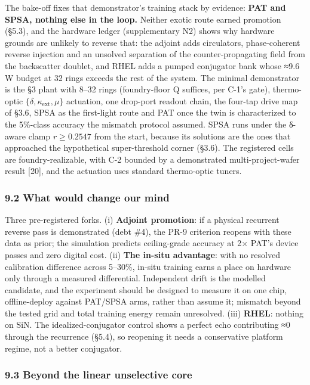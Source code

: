 \documentclass[
  10pt,
]{article}
\begin{document}
The bake-off fixes that demonstrator's training stack by evidence:
\textbf{PAT and SPSA, nothing else in the loop.} Neither exotic route
earned promotion (§5.3), and the hardware ledger (supplementary N2)
shows why hardware grounds are unlikely to reverse that: the adjoint
adds circulators, phase-coherent reverse injection and an unsolved
separation of the counter-propagating field from the backscatter
doublet, and RHEL adds a pumped conjugator bank whose ≈9.6 W budget at
32 rings exceeds the rest of the system. The minimal demonstrator is the
§3 plant with 8--32 rings (foundry-floor Q suffices, per C-1's gate),
thermo-optic \(\{\delta, \kappa_\text{ext}, \mu\}\) actuation, one
drop-port readout chain, the four-tap drive map of §3.6, SPSA as the
first-light route and PAT once the twin is characterized to the
5\%-class accuracy the mismatch protocol assumed. SPSA runs under the
δ-aware clamp \(r \geq 0.2547\) from the start, because its solutions
are the ones that approached the hypothetical super-threshold corner
(§3.6). The registered cells are foundry-realizable, with C-2 bounded by
a demonstrated multi-project-wafer result {[}20{]}, and the actuation
uses standard thermo-optic tuners.

\subsubsection{9.2 What would change our
mind}\label{what-would-change-our-mind}

Three pre-registered forks. (i) \textbf{Adjoint promotion}: if a
physical recurrent reverse pass is demonstrated (debt \#4), the PR-9
criterion reopens with these data as prior; the simulation predicts
ceiling-grade accuracy at 2× PAT's device passes and zero digital cost.
(ii) \textbf{The in-situ advantage}: with no resolved calibration
difference across 5--30\%, in-situ training earns a place on hardware
only through a measured differential. Independent drift is the modelled
candidate, and the experiment should be designed to measure it on one
chip, offline-deploy against PAT/SPSA arms, rather than assume it;
mismatch beyond the tested grid and total training energy remain
unresolved. (iii) \textbf{RHEL}: nothing on SiN. The
idealized-conjugator control shows a perfect echo contributing ≈0
through the recurrence (§5.4), so reopening it needs a conservative
platform regime, not a better conjugator.

\subsubsection{9.3 Beyond the linear unselective
core}\label{beyond-the-linear-unselective-core}
\end{document}
